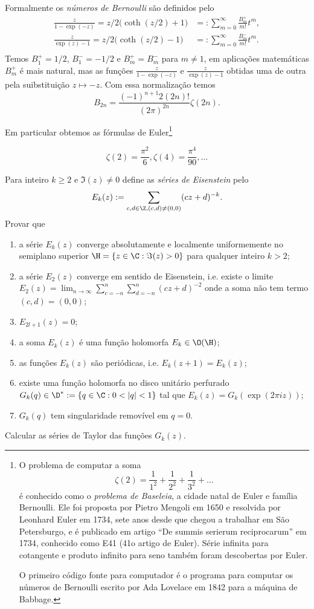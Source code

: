 Formalmente os \emph{números de Bernoulli} são definidos pelo
\begin{align}
\frac{z}{1-\exp(-z)} = z/2 \big(\coth(z/2)+1) &=: \sum_{m=0}^\infty \frac{B_m^+}{m!} t^m, \\
\frac{z}{\exp(z)-1} = z/2 \big(\coth(z/2)-1) &=: \sum_{m=0}^\infty \frac{B_m^-}{m!} t^m. \\
\end{align}
Temos $B_1^+ = 1/2$, $B_1^- = -1/2$ e $B_m^+ = B_m^-$ para $m\neq 1$,
em aplicações matemáticas $B_m^+$ é mais natural,
mas as funções $\frac{z}{1-\exp(-z)}$ e $\frac{z}{\exp(z)-1}$ obtidas uma de outra
pela suibstituição $z\mapsto -z$.
Com essa normalização temos
\begin{equation}
B_{2n} = \frac{(-1)^{n+1} 2 (2n)!}{(2\pi)^{2n}} \zeta(2n).
\end{equation}

Em particular obtemos as fórmulas de Euler\footnote{
O problema de computar a soma
\[ \zeta(2) = \frac{1}{1^2} + \frac{1}{2^2} + \frac{1}{3^2} + \dots \]
é conhecido como o \emph{problema de Baseleia},
a cidade natal de Euler e família Bernoulli.
Ele foi proposta por Pietro Mengoli em 1650 e resolvida
por Leonhard Euler em 1734, sete anos desde que chegou a trabalhar
em São Petersburgo, e é publicado em artigo ``De summis serierum reciprocarum''
em 1734, conhecido como E41 (41o artigo de Euler).
Série infinita para cotangente e produto infinito para seno
também foram descobertas por Euler.

O primeiro código fonte para computador é o programa para computar os números
de Bernoulli escrito por Ada Lovelace em 1842 para a máquina de Babbage.}

\[ \zeta(2) = \frac{\pi^2}{6}, \zeta(4) = \frac{\pi^4}{90}, \dots \]


\begin{problema}
Para inteiro $k\geq 2$ e $\Im(z)\neq 0$ define as \emph{séries de Eisenstein} pelo
\begin{equation}
E_k(z) := \sum_{c,d\in \Z, (c,d)\neq(0,0)} (cz+d)^{-k} .
\end{equation}
Provar que
\begin{enumerate}
\item a série $E_k(z)$ converge
absolutamente e localmente uniformemente no semiplano superior
$\H = \{z\in\C: \Im(z)>0\}$ para qualquer inteiro $k>2$;
\item a série $E_2(z)$ converge em sentido de Eisenstein,
i.e. existe o limite $E_2(z) = \lim_{n\to\infty} \sum_{c=-n}^n\sum_{d=-n}^n (cz+d)^{-2}$
onde a soma não tem termo $(c,d)=(0,0)$;
\item $E_{2l+1}(z) = 0$;
\item a soma $E_k(z)$ é uma função holomorfa $E_k \in \O(\H)$;
\item as funções $E_k(z)$ são periódicas, i.e. $E_k(z+1) = E_k(z)$;
\item existe uma função holomorfa no disco unitário perfurado
$G_k(q) \in \D^* := \{q\in\C: 0 < |q| < 1 \}$ tal que $E_k(z) = G_k(\exp(2\pi i z))$;
\item $G_k(q)$ tem singularidade removível em $q=0$.
\end{enumerate}
\end{problema}

\begin{problema}
Calcular as séries de Taylor das funções $G_k(z)$.
\end{problema}


